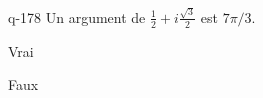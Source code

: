 \begin{truefalse}{q-178}
Un argument de $\frac{1}{2}+i\frac{\sqrt 3}{2}$ est $7\pi/3$.
\item* Vrai
\item Faux
\end{truefalse}

